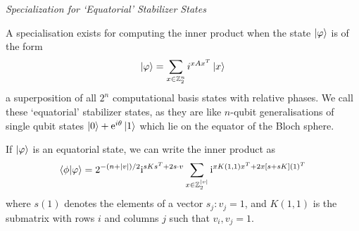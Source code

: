\large{\itshape{Specialization for `Equatorial' Stabilizer States}}\par
A specialisation exists for computing the inner product when the state $\ket{\varphi}$ is of the form
\[\ket{\varphi} = \sum_{x\in\mathbb{Z}_{2}^{n}}i^{xAx^{T}}\ket{x}\]
a superposition of all $2^{n}$ computational basis states with relative phases. We call these `equatorial' stabilizer states, as they are like $n$-qubit generalisations of single qubit states $\ket{0}+\mathrm{e}^{i\theta}\ket{1}$ which lie on the equator of the Bloch sphere.
\begin{cla}
If $\ket{\varphi}$ is an equatorial state, we can write the inner product as
\begin{equation}
\braket{\phi}{\varphi} = 2^{-(n+\vert v\vert)/2}\mathrm{i}^{sKs^{T}+2s\cdot v}\sum_{x\in\mathbb{Z}_{2}^{\vert v\vert}}\mathrm{i}^{xK(1,1)x^{T}+2x[s+sK](1)^{T}}
\end{equation}\label{claim:exp_sum_ip}
where $s(1)$ denotes the elements of a vector $s_{j}: v_{j}=1$, and $K(1,1)$ is the submatrix with rows $i$ and columns $j$ such that $v_{i},v_{j}=1$. 
\end{cla}
